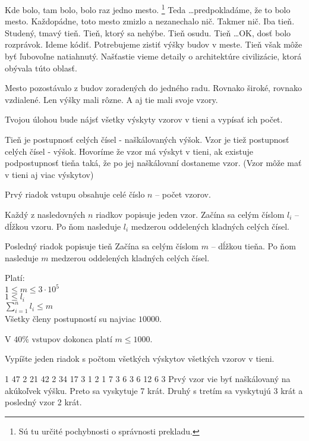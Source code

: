 





Kde bolo, tam bolo, bolo raz jedno mesto.
\footnote{Sú tu určité pochybnosti o správnosti prekladu.}
Teda \dots predpokladáme, že to bolo mesto.
Každopádne, toto mesto zmizlo a nezanechalo nič.
Takmer nič. Iba tieň. Studený, tmavý tieň.
Tieň, ktorý sa nehýbe. Tieň osudu.
Tieň \dots OK, dosť bolo rozprávok.
Ideme kódiť.
Potrebujeme zistiť výšky budov v meste.
Tieň však môže byť ľubovoľne natiahnutý.
Našťastie vieme detaily o architektúre civilizácie,
ktorá obývala túto oblasť.

Mesto pozostávalo z budov zoradených do jedného radu.
Rovnako široké, rovnako vzdialené. Len výšky mali rôzne.
A aj tie mali svoje vzory.

Tvojou úlohou bude nájsť všetky výskyty vzorov v tieni
a vypísať ich počet.



Tieň je postupnosť celých čísel - naškálovaných výšok.
Vzor je tiež postupnosť celých čísel - výšok.
Hovoríme že vzor má výskyt v tieni,
ak existuje podpostupnosť tieňa taká,
že po jej naškálovaní dostaneme vzor.
(Vzor môže mať v tieni aj viac výskytov)



Prvý riadok vstupu obsahuje celé číslo $n$
-- počet vzorov.

Každý z nasledovných $n$ riadkov popisuje jeden vzor.
Začína sa celým číslom $l_i$ -- dĺžkou vzoru.
Po ňom nasleduje $l_i$ medzerou oddelených kladných celých čísel.

Posledný riadok popisuje tieň
Začína sa celým číslom $m$ -- dĺžkou tieňa.
Po ňom nasleduje $m$ medzerou oddelených kladných celých čísel.

\bigskip

Platí:\\
$1 \leq m \leq 3\cdot10^5$\\
$1 \leq l_i$\\
$\sum^{n}_{i=1} l_i \leq m$\\
Všetky členy postupností su najviac $10000$.

\smallskip

V $40\%$ vstupov dokonca platí $m \leq 1000$.


Vypíšte jeden riadok s počtom všetkých výskytov
všetkých vzorov v tieni.



1 47
2 21 42
2 34 17
3 1 2 1
7 3 6 3 6 12 6 3
\sampleCOMMENT
Prvý vzor vie byť naškálovaný na akúkoľvek výšku.
Preto sa vyskytuje 7 krát. Druhý s tretím sa
vyskytujú 3 krát a posledný vzor 2 krát.
\sampleEND



